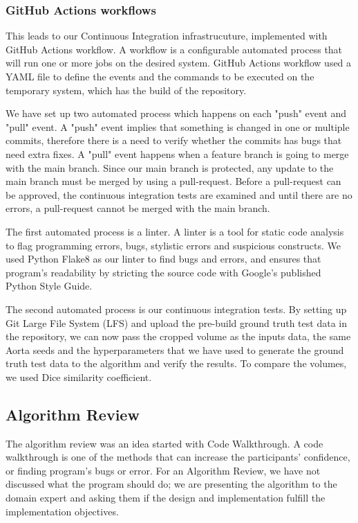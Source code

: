 \subsubsection{GitHub Actions workflows}
This leads to our Continuous Integration infrastrucuture, implemented with GitHub Actions workflow. A workflow is a configurable automated process that will run one or more jobs on the desired system. GitHub Actions workflow used a YAML file to define the events and the commands to be executed on the temporary system, which has the build of the repository. \cite{GitHubActions}

We have set up two automated process which happens on each "push" event and "pull" event. A "push" event implies that something is changed in one or multiple commits, therefore there is a need to verify whether the commits has bugs that need extra fixes. A "pull" event happens when a feature branch is going to merge with the main branch. Since our main branch is protected, any update to the main branch must be merged by using a pull-request. Before a pull-request can be approved, the continuous integration tests are examined and until there are no errors, a pull-request cannot be merged with the main branch. 

The first automated process is a linter. A linter is a tool for static code analysis to flag programming errors, bugs, stylistic errors and suspicious constructs. We used Python Flake8 as our linter to find bugs and errors, and ensures that program's readability by stricting the source code with Google's published  Python Style Guide. \cite{Linter}

The second automated process is our continuous integration tests. By setting up Git Large File System (LFS) and upload the pre-build ground truth test data in the repository, we can now pass the cropped volume as the inputs data, the same Aorta seeds and the hyperparameters that we have used to generate the ground truth test data to the algorithm and verify the results. To compare the volumes, we used Dice similarity coefficient.

\subsection{Algorithm Review}

The algorithm review was an idea started with Code Walkthrough. A code walkthrough is one of the methods that can increase the participants' confidence, or finding program's bugs or error. For an Algorithm Review, we have not discussed what the program should do; we are presenting the algorithm to the domain expert and asking them if the design and implementation fulfill the implementation objectives.

